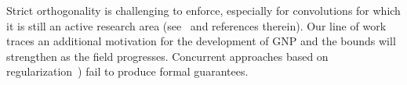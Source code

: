 \begin{remark}\label{remark:gnp}
        Strict orthogonality is challenging to enforce, especially for convolutions for which it is still an active research area (see~\cite{trockman2021orthogonalizing,singla2021skew,achour2022existence,singla2022improved,xu2022lot} and references therein). Our line of work traces an additional motivation for the development of GNP and the bounds will strengthen as the field progresses. Concurrent approaches based on regularization~\citep{gulrajani2017improved,cisse2017parseval,gouk2021regularisation}) fail to produce formal guarantees.  
\end{remark}  
    
